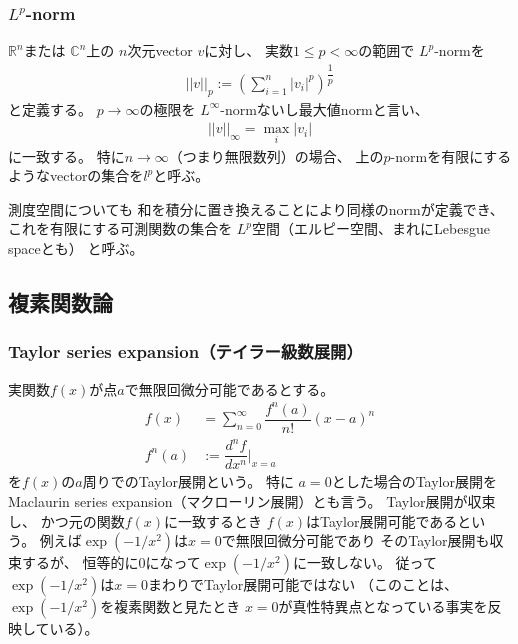 \subsubsection{$L^p$-norm}

$\mathbb{R}^n$または
$\mathbb{C}^n$上の
$n$次元vector $v$に対し、
実数$1\le p < \infty$の範囲で
$L^p$-normを
\begin{align}
    ||v||_p
:=
    \left(
        \sum_{i=1}^n
        |v_i|^p
    \right)^{ \dfrac{1}{p} }
\end{align}
と定義する。
$p\to\infty$の極限を
$L^\infty$-normないし最大値normと言い、
\begin{align}
    ||v||_\infty
=
    \max_i
    |v_i|
\end{align}
に一致する。
特に$n \to \infty$（つまり無限数列）の場合、
上の$p$-normを有限にするようなvectorの集合を$l^p$と呼ぶ。

測度空間についても
和を積分に置き換えることにより同様のnormが定義でき、
これを有限にする可測関数の集合を
$L^p$空間（エルピー空間、まれにLebesgue spaceとも）
と呼ぶ。

\newpage
\subsection{複素関数論}

\subsubsection{Taylor series expansion（テイラー級数展開）}

実関数$f(x)$が点$a$で無限回微分可能であるとする。
\begin{subequations}
\begin{align}
    f(x)
    &=
    \sum_{n=0}^{\infty}
    \dfrac{ f^{n}(a) }{n!}
    (x-a)^n
\label{Taylor series expansion}
\\
    f^{n}(a)
    &:=
    \dfrac{d^nf}{dx^n}\bigg|_{x=a}
\end{align}
\end{subequations}
を$f(x)$の$a$周りでのTaylor展開という。
特に
$a=0$とした場合のTaylor展開を
Maclaurin series expansion（マクローリン展開）とも言う。
Taylor展開が収束し、
かつ元の関数$f(x)$に一致するとき
$f(x)$はTaylor展開可能であるという。
例えば$\exp(-1/x^2)$は$x=0$で無限回微分可能であり
そのTaylor展開も収束するが、
恒等的に$0$になって$\exp(-1/x^2)$に一致しない。
従って$\exp(-1/x^2)$は$x=0$まわりでTaylor展開可能ではない
（このことは、$\exp(-1/x^2)$を複素関数と見たとき
$x=0$が真性特異点となっている事実を反映している）。

